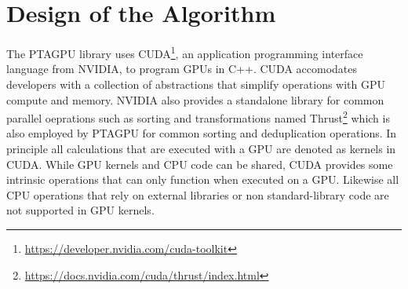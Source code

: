 \section{Design of the Algorithm}\label{sec:design}
The PTAGPU library uses CUDA\footnote{\url{https://developer.nvidia.com/cuda-toolkit}}, an application programming interface language from NVIDIA, to program GPUs in C++.
CUDA accomodates developers with a collection of abstractions that simplify operations with GPU compute and memory. NVIDIA also provides a standalone library for common parallel oeprations such as sorting and transformations named Thrust\footnote{\url{https://docs.nvidia.com/cuda/thrust/index.html}} which is also employed by PTAGPU for common sorting and deduplication operations.
In principle all calculations that are executed with a GPU are denoted as kernels in CUDA. While GPU kernels and CPU code can be shared, CUDA provides some intrinsic operations that can only function when executed on a GPU.
Likewise all CPU operations that rely on external libraries or non standard-library code are not supported in GPU kernels.

